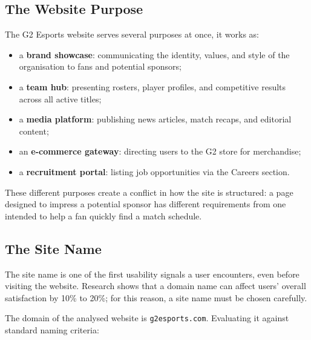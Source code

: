 \documentclass[12pt, a4paper]{article}
\begin{document}
\subsection{The Website Purpose}

The G2 Esports website serves several purposes at once, it works as:

\begin{itemize}[noitemsep]
  \item a \textbf{brand showcase}: communicating the identity, values, and style of the organisation to fans and potential sponsors;
  \item a \textbf{team hub}: presenting rosters, player profiles, and competitive results across all active titles;
  \item a \textbf{media platform}: publishing news articles, match recaps, and editorial content;
  \item an \textbf{e-commerce gateway}: directing users to the G2 store for merchandise;
  \item a \textbf{recruitment portal}: listing job opportunities via the Careers section.
\end{itemize}

These different purposes create a conflict in how the site is structured: a page designed to impress a potential sponsor has different requirements from one intended to help a fan quickly find a match schedule.

\subsection{The Site Name}

The site name is one of the first usability signals a user encounters, even before visiting the website. Research shows that a domain name can affect users' overall satisfaction by 10\% to 20\%; for this reason, a site name must be chosen carefully.

The domain of the analysed website is \texttt{g2esports.com}. Evaluating it against standard naming criteria:
\end{document}
